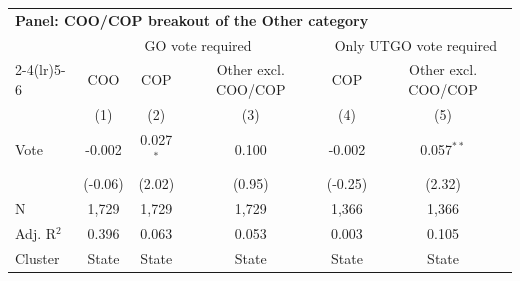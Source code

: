 \begingroup
\centering
\begin{tabular*}{\textwidth}{@{\extracolsep{\fill}}lccccc}
\multicolumn{6}{l}{\textbf{Panel: COO/COP breakout of the Other category}}\\

\addlinespace
   \toprule
     & \multicolumn{3}{c}{GO vote required} & \multicolumn{2}{c}{Only UTGO vote required} \\ 
   \cmidrule(lr){2-4}\cmidrule(lr){5-6}
                  & COO      & COP         & Other excl. COO/COP & COP      & Other excl. COO/COP \\   
                  & (1)      & (2)         & (3)                 & (4)      & (5)\\  
   \midrule 
   Vote           & -0.002   & 0.027$^{*}$ & 0.100               & -0.002   & 0.057$^{**}$\\   
                  & (-0.06) & (2.02)     & (0.95)             & (-0.25) & (2.32)\\   
   \hline
   N   & 1,729    & 1,729       & 1,729               & 1,366    & 1,366\\  
   Adj. R$^2$ & 0.396    & 0.063       & 0.053               & 0.003    & 0.105\\  
   Cluster              & State & State & State & State & State\\  
   \bottomrule
\end{tabular*}
\par\endgroup
